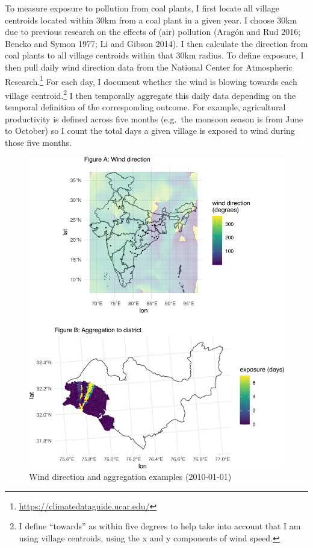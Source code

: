 \documentclass[
]{article}
\begin{document}
To measure exposure to pollution from coal plants, I first locate all village centroids located within 30km from a coal plant in a given year. I choose 30km due to previous research on the effects of (air) pollution (Aragón and Rud 2016; Bencko and Symon 1977; Li and Gibson 2014). I then calculate the direction from coal plants to all village centroids within that 30km radius. To define exposure, I then pull daily wind direction data from the National Center for Atmospheric Research.\footnote{\url{https://climatedataguide.ucar.edu/}} For each day, I document whether the wind is blowing towards each village centroid.\footnote{I define ``towards'' as within five degrees to help take into account that I am using village centroids, using the x and y components of wind speed.} I then temporally aggregate this daily data depending on the temporal definition of the corresponding outcome. For example, agricultural productivity is defined across five months (e.g.~the monsoon season is from June to October) so I count the total days a given village is exposed to wind during those five months.

\begin{figure}
\includegraphics{draft_files/figure-latex/windexample-1} \caption[Wind direction and aggregation examples (2010-01-01)]{Wind direction and aggregation examples (2010-01-01)}\label{fig:windexample}
\end{figure}
\end{document}
